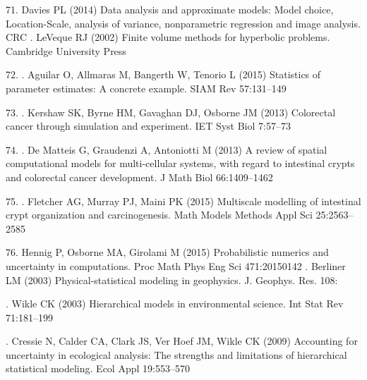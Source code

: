 \documentclass[10pt,letterpaper]{article}
\providecommand{\DIFaddtex}[1]{{\protect\color{blue} \sf #1}} %
\providecommand{\DIFdeltex}[1]{{\protect\color{red} \scriptsize #1}} %
\providecommand{\DIFaddbegin}{} %
\providecommand{\DIFaddend}{} %
\providecommand{\DIFdelbegin}{} %
\providecommand{\DIFdelend}{} %
\providecommand{\DIFadd}[1]{\texorpdfstring{\DIFaddtex{#1}}{#1}} %
\providecommand{\DIFdel}[1]{\texorpdfstring{\DIFdeltex{#1}}{}} %
\begin{document}
\DIFdelbegin %
\DIFdel{71. Davies PL (2014) Data analysis and approximate models: Model choice,
Location-Scale, analysis of variance, nonparametric regression and image
analysis.
CRC }\DIFdelend \DIFaddbegin \hypertarget{ref-LeVeque2002-eq}{}
\DIFadd{59. LeVeque RJ (2002) Finite volume methods for hyperbolic problems.
Cambridge University }\DIFaddend Press

\hypertarget{ref-Aguilar2015-um}{}
\DIFdelbegin \DIFdel{72. }\DIFdelend \DIFaddbegin \DIFadd{60. }\DIFaddend Aguilar O, Allmaras M, Bangerth W, Tenorio L (2015) Statistics of
parameter estimates: A concrete example. SIAM Rev 57:131--149

\hypertarget{ref-Kershaw2013-jb}{}
\DIFdelbegin \DIFdel{73. }\DIFdelend \DIFaddbegin \DIFadd{61. }\DIFaddend Kershaw SK, Byrne HM, Gavaghan DJ, Osborne JM (2013) Colorectal
cancer through simulation and experiment. IET Syst Biol 7:57--73

\hypertarget{ref-De_Matteis2013-zo}{}
\DIFdelbegin \DIFdel{74. }\DIFdelend \DIFaddbegin \DIFadd{62. }\DIFaddend De Matteis G, Graudenzi A, Antoniotti M (2013) A review of spatial
computational models for multi-cellular systems, with regard to
intestinal crypts and colorectal cancer development. J Math Biol
66:1409--1462

\hypertarget{ref-Fletcher2015-yc}{}
\DIFdelbegin \DIFdel{75. }\DIFdelend \DIFaddbegin \DIFadd{63. }\DIFaddend Fletcher AG, Murray PJ, Maini PK (2015) Multiscale modelling of
intestinal crypt organization and carcinogenesis. Math Models Methods
Appl Sci 25:2563--2585

\DIFdelbegin %
\DIFdel{76. Hennig P, Osborne MA, Girolami M (2015)
Probabilistic numerics and
uncertainty in computations. Proc Math Phys Eng Sci 471:20150142
}\DIFdelend \DIFaddbegin \hypertarget{ref-Berliner2003-yl}{}
\DIFadd{64. Berliner LM (2003) Physical-statistical modeling in geophysics. J.
Geophys. Res. 108:
}\DIFaddend 

\DIFaddbegin \hypertarget{ref-Wikle2003-je}{}
\DIFadd{65. Wikle CK (2003) Hierarchical models in environmental science. Int
Stat Rev 71:181--199
}

\hypertarget{ref-Cressie2009-wy}{}
\DIFadd{66. Cressie N, Calder CA, Clark JS, Ver Hoef JM, Wikle CK (2009)
Accounting for uncertainty in ecological analysis: The strengths and
limitations of hierarchical statistical modeling. Ecol Appl 19:553--570
}
\end{document}

